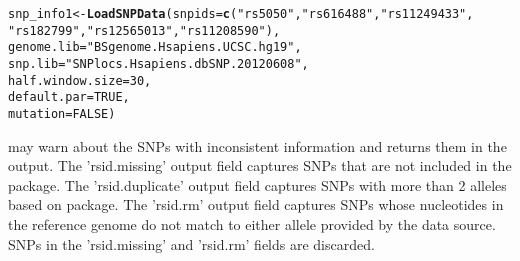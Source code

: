 \documentclass[a4paper,10pt]{article}\usepackage[]{graphicx}\usepackage[]{color}
\makeatletter
\newcommand{\hlnum}[1]{\textcolor[rgb]{0.686,0.059,0.569}{#1}}%
\newcommand{\hlstr}[1]{\textcolor[rgb]{0.192,0.494,0.8}{#1}}%
\newcommand{\hlstd}[1]{\textcolor[rgb]{0.345,0.345,0.345}{#1}}%
\newcommand{\hlkwb}[1]{\textcolor[rgb]{0.69,0.353,0.396}{#1}}%
\newcommand{\hlkwc}[1]{\textcolor[rgb]{0.333,0.667,0.333}{#1}}%
\newcommand{\hlkwd}[1]{\textcolor[rgb]{0.737,0.353,0.396}{\textbf{#1}}}%
\newenvironment{kframe}{%
 \def\at@end@of@kframe{}%
 \ifinner\ifhmode%
  \def\at@end@of@kframe{\end{minipage}}%
  \begin{minipage}{\columnwidth}%
 \fi\fi%
 \def\FrameCommand##1{\hskip\@totalleftmargin \hskip-\fboxsep
 \colorbox{shadecolor}{##1}\hskip-\fboxsep
     \hskip-\linewidth \hskip-\@totalleftmargin \hskip\columnwidth}%
 \MakeFramed {\advance\hsize-\width
   \@totalleftmargin\z@ \linewidth\hsize
   \@setminipage}}%
 {\par\unskip\endMakeFramed%
 \at@end@of@kframe}
\newenvironment{knitrout}{}{} %
\makeatother
\begin{document}
\begin{knitrout}
\color{fgcolor}\begin{kframe}
\begin{alltt}
\hlstd{snp_info1} \hlkwb{<-} \hlkwd{LoadSNPData}\hlstd{(}\hlkwc{snpids} \hlstd{=} \hlkwd{c}\hlstd{(}\hlstr{"rs5050"}\hlstd{,} \hlstr{"rs616488"}\hlstd{,} \hlstr{"rs11249433"}\hlstd{,}
                           \hlstr{"rs182799"}\hlstd{,} \hlstr{"rs12565013"}\hlstd{,} \hlstr{"rs11208590"}\hlstd{),}
                         \hlkwc{genome.lib} \hlstd{=} \hlstr{"BSgenome.Hsapiens.UCSC.hg19"}\hlstd{,}
                         \hlkwc{snp.lib} \hlstd{=} \hlstr{"SNPlocs.Hsapiens.dbSNP.20120608"}\hlstd{,}
                         \hlkwc{half.window.size} \hlstd{=} \hlnum{30}\hlstd{,}
                         \hlkwc{default.par} \hlstd{=} \hlnum{TRUE}\hlstd{,}
                         \hlkwc{mutation} \hlstd{=} \hlnum{FALSE}\hlstd{)}
\end{alltt}


{\ttfamily\noindent\itshape\color{messagecolor}{\#\# Warning: the following rsids are not included in the database and discarded: \\\#\# rs182799\\\#\# Warning: the following SNPs have more than 2 alleles, and only the first two alleles are used as the SNP and the reference allele:\\\#\# rs12565013, rs11208590\\\#\# Warning: the following sequences are discarded because the reference nucleotide matches to neither a1 nor a2:\\\#\# snpid	chr	snp	a1	a2\\\#\# rs11208590	chr1	41108149	A	C}}\end{kframe}
\end{knitrout}

 may warn about the SNPs with inconsistent information and returns them in the output. The 'rsid.missing' output field captures SNPs that are not included in the  package. The 'rsid.duplicate' output field captures SNPs with more than 2 alleles based on  package. The 'rsid.rm' output field captures SNPs whose nucleotides in the reference genome do not match to either allele provided by the data source. SNPs in the 'rsid.missing' and 'rsid.rm' fields are discarded.
\end{document}
